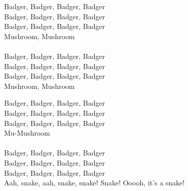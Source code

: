\vspace{10pt}
Badger, Badger, Badger, Badger\\
Badger, Badger, Badger, Badger\\
Badger, Badger, Badger, Badger\\
Mushroom, Mushroom\\
\\
Badger, Badger, Badger, Badger\\
Badger, Badger, Badger, Badger\\
Badger, Badger, Badger, Badger\\
Mushroom, Mushroom\par
\vspace{10pt}
Badger, Badger, Badger, Badger\\
Badger, Badger, Badger, Badger\\
Badger, Badger, Badger, Badger\\
Mu-Mushroom\\
\\
Badger, Badger, Badger, Badger\\
Badger, Badger, Badger, Badger\\
Badger, Badger, Badger, Badger\\
Aah, snake, aah, snake, snake! Snake! Ooooh, it's a snake!

